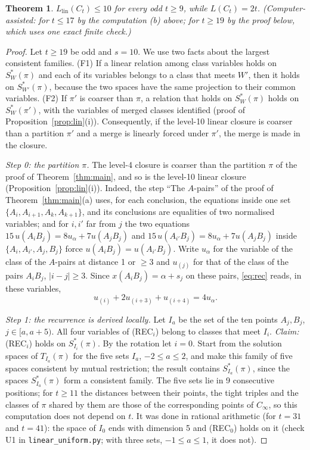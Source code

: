 \documentclass[11pt,a4paper]{article}
\newtheorem{theorem}{Theorem}
\theoremstyle{definition}
\theoremstyle{remark}
\newcommand{\file}[1]{\texttt{#1}}
\newcommand{\step}[1]{\smallskip\noindent\emph{#1}}
\begin{document}
\begin{theorem}\label{thm:lin}
$L_{\mathrm{lin}}(C_t) \le 10$ for every odd $t \ge 9$, while $L(C_t) = 2t$. (Computer-assisted: for $t \le 17$ by
the computation (b) above; for $t \ge 19$ by the proof below, which uses one exact finite check.)
\end{theorem}

\begin{proof}
Let $t \ge 19$ be odd and $s = 10$. We use two facts about the largest consistent families. (F1) If a linear
relation among class variables holds on $S^*_W(\pi)$ and each of its variables belongs to a class that meets $W'$,
then it holds on $S^*_{W'}(\pi)$, because the two spaces have the same projection to their common variables.
(F2) If $\pi'$ is coarser than $\pi$, a relation that holds on $S^*_W(\pi)$ holds on $S^*_W(\pi')$, with the
variables of merged classes identified (proof of Proposition~\ref{prop:lin}(i)). Consequently, if the level-10 linear closure is coarser than a
partition $\pi'$ and a merge is linearly forced under $\pi'$, the merge is made in the closure.

\step{Step 0: the partition $\pi$.} The level-4 closure is coarser than the partition $\pi$ of the proof of
Theorem~\ref{thm:main}, and so is the level-10 linear closure (Proposition~\ref{prop:lin}(i)). Indeed, the step
``The $A$-pairs'' of the proof of Theorem~\ref{thm:main}(a) uses, for each conclusion, the equations inside one set
$\{A_i, A_{i+1}, A_k, A_{k+1}\}$, and its conclusions are equalities of two normalised variables; and for $i, i'$
far from $j$ the two equations $15\,u(A_iB_j) = 8u_\alpha + 7u(A_jB_j)$ and $15\,u(A_{i'}B_j) = 8u_\alpha + 7u(A_jB_j)$
inside $\{A_i, A_{i'}, A_j, B_j\}$ force $u(A_iB_j) = u(A_{i'}B_j)$. Write $u_\alpha$ for the variable of the class
of the $A$-pairs at distance 1 or $\ge 3$ and $u_{(j)}$ for that of the class of the pairs $A_iB_j$, $|i - j| \ge 3$.
Since $x(A_iB_j) = \alpha + s_j$ on these pairs, \eqref{eq:rec} reads, in these variables,
\[
  u_{(i)} + 2u_{(i+3)} + u_{(i+4)} = 4u_\alpha . \tag{REC$_i$}
\]

\step{Step 1: the recurrence is derived locally.} Let $I_a$ be the set of the ten points $A_j, B_j$,
$j \in [a, a + 5)$. All four variables of (REC$_i$) belong to classes that meet $I_i$. \emph{Claim:} (REC$_i$) holds
on $S^*_{I_i}(\pi)$. By the rotation let $i = 0$. Start from the solution spaces of $T_{I_a}(\pi)$ for the five sets
$I_a$, $-2 \le a \le 2$, and make this family of five spaces consistent by mutual restriction; the result contains
$S^*_{I_a}(\pi)$, since the spaces $S^*_{I_a}(\pi)$ form a consistent family. The five sets lie in 9 consecutive
positions; for $t \ge 11$ the distances between their points, the tight triples and the classes of $\pi$ shared by
them are those of the corresponding points of $C_\infty$, so this computation does not depend on $t$. It was done in
rational arithmetic (for $t = 31$ and $t = 41$): the space of $I_0$ ends with dimension 5 and (REC$_0$) holds on it
(check U1 in \file{linear\_uniform.py}; with three sets, $-1 \le a \le 1$, it does not).


\end{proof}
\end{document}
